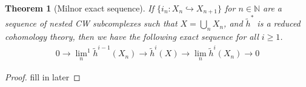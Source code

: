 \documentclass[12pt, notitlepage]{article}
\newtheorem{thm}{Theorem}[section]
\theoremstyle{definition}
\newcommand{\redco}{\widetilde{h}}
\begin{document}
\begin{thm}[Milnor exact sequence] \label{thm-milnor} If $\{ i_n : X_n \hookrightarrow X_{n+1} \}$
  for $n \in \mathbb{N}$ are a sequence of nested CW subcomplexes such that $X = \bigcup_n X_n$, and
  $\redco^{\ast}$ is a reduced cohomology theory, then we have the following exact sequence for all
  $i \geq 1$.
  \begin{align*}
    0 \rightarrow {\lim_{n}}^1 \redco^{i-1}(X_n) \rightarrow \redco^i(X) \rightarrow \lim_n \redco^i(X_n) \rightarrow 0
  \end{align*}
\end{thm}

\begin{proof}
  fill in later
\end{proof}

%  
\end{document}
